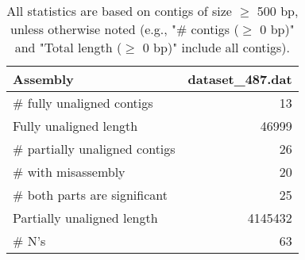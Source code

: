 \documentclass[12pt,a4paper]{article}
\begin{document}
\begin{table}[ht]
\begin{center}
\caption{All statistics are based on contigs of size $\geq$ 500 bp, unless otherwise noted (e.g., "\# contigs ($\geq$ 0 bp)" and "Total length ($\geq$ 0 bp)" include all contigs).}
\begin{tabular}{|l*{1}{|r}|}
\hline
Assembly & dataset\_487.dat \\ \hline
\# fully unaligned contigs & 13 \\ \hline
Fully unaligned length & 46999 \\ \hline
\# partially unaligned contigs & 26 \\ \hline
\hspace{5mm}\# with misassembly & 20 \\ \hline
\hspace{5mm}\# both parts are significant & 25 \\ \hline
Partially unaligned length & 4145432 \\ \hline
\# N's & 63 \\ \hline
\end{tabular}
\end{center}
\end{table}
\end{document}
